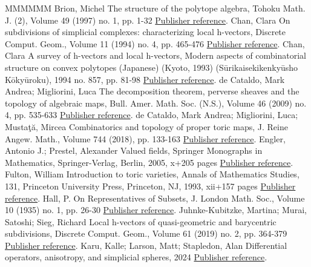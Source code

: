 \begin{thebibliography}{MMMMMM}
 Brion, Michel The structure of the polytope algebra, Tohoku Math. J. (2), Volume 49 (1997) no. 1, pp. 1-32 \href{https://alco.centre-mersenne.org/articles/10.5802/alco.453/#BrionStructurePolytopeAlgebra}{Publisher reference}.
 Chan, Clara On subdivisions of simplicial complexes: characterizing local h-vectors, Discrete Comput. Geom., Volume 11 (1994) no. 4, pp. 465-476 \href{https://alco.centre-mersenne.org/articles/10.5802/alco.453/#ChanLocal}{Publisher reference}.
 Chan, Clara A survey of h-vectors and local h-vectors, Modern aspects of combinatorial structure on convex polytopes (Japanese) (Kyoto, 1993) (Sūrikaisekikenkyūsho Kōkyūroku), 1994 no. 857, pp. 81-98 \href{https://alco.centre-mersenne.org/articles/10.5802/alco.453/#ChanSurvey}{Publisher reference}.
 de Cataldo, Mark Andrea; Migliorini, Luca The decomposition theorem, perverse sheaves and the topology of algebraic maps, Bull. Amer. Math. Soc. (N.S.), Volume 46 (2009) no. 4, pp. 535-633 \href{https://alco.centre-mersenne.org/articles/10.5802/alco.453/#dCM}{Publisher reference}.
 de Cataldo, Mark Andrea; Migliorini, Luca; Mustaţă, Mircea Combinatorics and topology of proper toric maps, J. Reine Angew. Math., Volume 744 (2018), pp. 133-163 \href{https://alco.centre-mersenne.org/articles/10.5802/alco.453/#deCataldoMiglioriniMustata18}{Publisher reference}.
 Engler, Antonio J.; Prestel, Alexander Valued fields, Springer Monographs in Mathematics, Springer-Verlag, Berlin, 2005, x+205 pages \href{https://alco.centre-mersenne.org/articles/10.5802/alco.453/#EPValuedFields}{Publisher reference}.
 Fulton, William Introduction to toric varieties, Annals of Mathematics Studies, 131, Princeton University Press, Princeton, NJ, 1993, xii+157 pages \href{https://alco.centre-mersenne.org/articles/10.5802/alco.453/#Fulton}{Publisher reference}.
 Hall, P. On Representatives of Subsets, J. London Math. Soc., Volume 10 (1935) no. 1, pp. 26-30 \href{https://alco.centre-mersenne.org/articles/10.5802/alco.453/#HallRepresentativesSubsets}{Publisher reference}.
 Juhnke-Kubitzke, Martina; Murai, Satoshi; Sieg, Richard Local h-vectors of quasi-geometric and barycentric subdivisions, Discrete Comput. Geom., Volume 61 (2019) no. 2, pp. 364-379 \href{https://alco.centre-mersenne.org/articles/10.5802/alco.453/#JKSS}{Publisher reference}.
 Karu, Kalle; Larson, Matt; Stapledon, Alan Differential operators, anisotropy, and simplicial spheres, 2024 \href{https://alco.centre-mersenne.org/articles/10.5802/alco.453/#KLS}{Publisher reference}.

\end{thebibliography}
